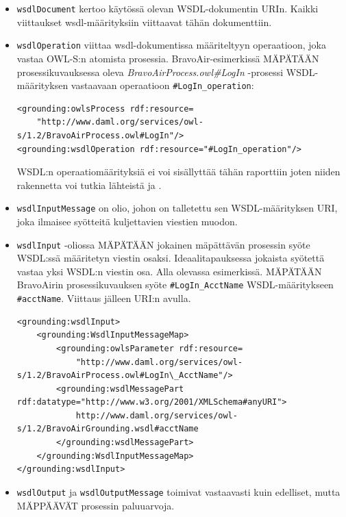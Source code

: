 \documentclass[finnish]{tktltiki2}
\theoremstyle{definition}
\theoremstyle{remark}
\begin{document}
\begin{itemize}
\item \texttt{wsdlDocument} kertoo käytössä olevan WSDL-dokumentin URIn. Kaikki viittaukset wsdl-määrityksiin viittaavat tähän dokumenttiin. 

\item \texttt{wsdlOperation} viittaa wsdl-dokumentissa määriteltyyn operaatioon, joka vastaa OWL-S:n  atomista prosessia. BravoAir-esimerkissä MÄPÄTÄÄN 
prosessikuvauksessa oleva \textit{BravoAirProcess.owl\#LogIn} -prosessi WSDL-määrityksen vastaavaan operaatioon \texttt{\#LogIn\_operation}: 

\small
\begin{verbatim}
<grounding:owlsProcess rdf:resource=
    "http://www.daml.org/services/owl-s/1.2/BravoAirProcess.owl#LogIn"/>
<grounding:wsdlOperation rdf:resource="#LogIn_operation"/>
\end{verbatim}
\normalsize

WSDL:n operaatiomäärityksiä ei voi sisällyttää tähän raporttiin joten niiden rakennetta voi tutkia lähteistä \cite{daml} ja \cite{WSDL}. 

\item \texttt{wsdlInputMessage} on olio, johon on talletettu sen  WSDL-määrityksen URI, joka ilmaisee syötteitä kuljettavien viestien muodon.  

\item \texttt{wsdlInput} -oliossa MÄPÄTÄÄN jokainen mäpättävän prosessin syöte WSDL:ssä  määritetyn viestin osaksi. Ideaalitapauksessa jokaista syötettä vastaa yksi WSDL:n viestin osa. Alla olevassa esimerkissä. MÄPÄTÄÄN BravoAirin prosessikuvauksen syöte \texttt{\#LogIn\_AcctName} WSDL-määritykseen  \texttt{\#acctName}. Viittaus jälleen URI:n avulla. 
\footnotesize
\begin{verbatim}
<grounding:wsdlInput>
    <grounding:WsdlInputMessageMap>
        <grounding:owlsParameter rdf:resource=
            "http://www.daml.org/services/owl-s/1.2/BravoAirProcess.owl#LogIn\_AcctName"/>
        <grounding:wsdlMessagePart rdf:datatype="http://www.w3.org/2001/XMLSchema#anyURI">
            http://www.daml.org/services/owl-s/1.2/BravoAirGrounding.wsdl#acctName
        </grounding:wsdlMessagePart>
    </grounding:WsdlInputMessageMap>
</grounding:wsdlInput>
\end{verbatim}
\normalsize

\item \texttt{wsdlOutput} ja \texttt{wsdlOutputMessage} toimivat vastaavasti kuin edelliset, mutta MÄPPÄÄVÄT prosessin paluuarvoja.
\end{itemize}
\end{document}
